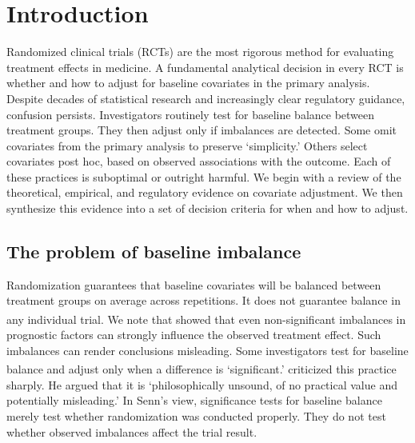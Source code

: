 \documentclass[
  11pt,
]{article}
\begin{document}
\section{Introduction}\label{introduction}

Randomized clinical trials (RCTs) are the most rigorous
method for evaluating treatment effects in medicine. A
fundamental analytical decision in every RCT is whether
and how to adjust for baseline covariates in the
primary analysis.
Despite decades of statistical research and
increasingly clear regulatory guidance, confusion
persists. Investigators routinely test for baseline
balance between treatment groups. They then adjust
only if imbalances are detected. Some omit covariates
from the primary analysis to preserve `simplicity.'
Others select covariates post hoc, based on observed
associations with the outcome. Each of these practices
is suboptimal or outright harmful. We begin with a
review of the theoretical, empirical, and regulatory
evidence on covariate adjustment. We then synthesize
this evidence into a set of decision criteria for
when and how to adjust.

\subsection{The problem of baseline imbalance}\label{the-problem-of-baseline-imbalance}

Randomization guarantees that baseline covariates will
be balanced between treatment groups on average across
repetitions. It does not guarantee balance in any
individual trial. We note that\textsuperscript{} showed that
even non-significant imbalances in prognostic factors
can strongly influence the observed treatment effect.
Such imbalances can render conclusions misleading.
Some investigators test for baseline balance and adjust
only when a difference is `significant.'\textsuperscript{} criticized this
practice sharply. He argued that it is
`philosophically unsound, of no practical value and
potentially misleading.' In Senn's view, significance
tests for baseline balance merely test whether
randomization was conducted properly. They do not test
whether observed imbalances affect the trial result.
\end{document}
